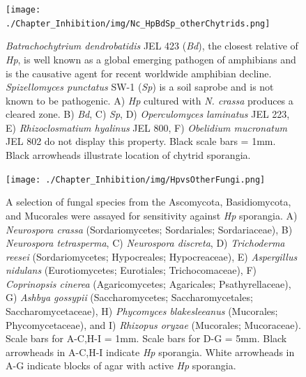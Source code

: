\begin{figure}[hb]
  \centering
  \texttt{[image: ./Chapter\_Inhibition/img/Nc\_HpBdSp\_otherChytrids.png]}
  \caption[Inhibition of \textit{N. crassa} is observed with \textit{H. polyrhiza} and not other chytrids.]{\textit{Batrachochytrium dendrobatidis} JEL 423 (\textit{Bd}), the closest relative of \textit{Hp}, is well known as a global emerging pathogen of amphibians and is the causative agent for recent worldwide amphibian decline. \textit{Spizellomyces punctatus} SW-1 (\textit{Sp}) is a soil saprobe and is not known to be pathogenic. A) \textit{Hp} cultured with \textit{N. crassa} produces a cleared zone. B) \textit{Bd}, C) \textit{Sp}, D) \textit{Operculomyces laminatus} JEL 223, E) \textit{Rhizoclosmatium hyalinus} JEL 800, F) \textit{Obelidium mucronatum} JEL 802 do not display this property. Black scale bars = 1mm. Black arrowheads illustrate location of chytrid sporangia.}
  \label{fig:ChInhib_NcraChytrids}
\end{figure}

\begin{figure}[hb]
  \centering
  \texttt{[image: ./Chapter\_Inhibition/img/HpvsOtherFungi.png]}
  \caption[Inhibitory properties of \textit{H. polyrhiza} are not specific to \textit{N. crassa}.]{A selection of fungal species from the Ascomycota, Basidiomycota, and Mucorales were assayed for sensitivity against \textit{Hp} sporangia. A) \textit{Neurospora crassa} (Sordariomycetes; Sordariales; Sordariaceae), B) \textit{Neurospora tetrasperma}, C) \textit{Neurospora discreta}, D) \textit{Trichoderma reesei} (Sordariomycetes; Hypocreales; Hypocreaceae), E) \textit{Aspergillus nidulans} (Eurotiomycetes; Eurotiales; Trichocomaceae), F) \textit{Coprinopsis cinerea} (Agaricomycetes; Agaricales; Psathyrellaceae), G) \textit{Ashbya gossypii} (Saccharomycetes; Saccharomycetales; Saccharomycetaceae), H) \textit{Phycomyces blakesleeanus} (Mucorales; Phycomycetaceae), and I) \textit{Rhizopus oryzae} (Mucorales; Mucoraceae). Scale bars for A-C,H-I = 1mm. Scale bars for D-G = 5mm. Black arrowheads in A-C,H-I indicate \textit{Hp} sporangia. White arrowheads in A-G indicate blocks of agar with active \textit{Hp} sporangia.}
  \label{fig:ChInhib_HpOtherFungi}
\end{figure}

